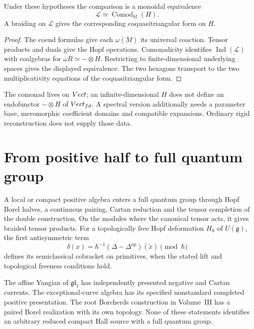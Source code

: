 \begin{theorem}
Under these hypotheses the comparison is a monoidal equivalence
\[
 \mathcal L\simeq\operatorname{Comod}_{\mathrm{fd}}(H).
\]
A braiding on $\mathcal L$ gives the corresponding coquasitriangular
form on $H$.
\end{theorem}
\begin{proof}
The coend formulas give each $\omega(M)$ its universal coaction.
Tensor products and duals give the Hopf operations. Comonadicity
identifies $\operatorname{Ind}(\mathcal L)$ with coalgebras for
$\overline\omega R\simeq-\otimes H$. Restricting to finite-dimensional
underlying spaces gives the displayed equivalence. The two hexagons
transport to the two multiplicativity equations of the
coquasitriangular form.
\end{proof}

The comonad lives on $Vect$; an infinite-dimensional $H$ does not
define an endofunctor $-\otimes H$ of $Vect_{fd}$.
A spectral version additionally needs a parameter base, meromorphic
coefficient domains and compatible expansions. Ordinary rigid
reconstruction does not supply those data.

\section{From positive half to full quantum group}
A local or compact positive algebra enters a full quantum group
through Hopf Borel halves, a continuous pairing, Cartan reduction and
the tensor completion of the double construction. On the modules
where the canonical tensor acts, it gives braided tensor products.
For a topologically free Hopf deformation $H_\hbar$ of $U(\mathfrak g)$,
the first antisymmetric term
\[
 \delta(x)=\hbar^{-1}(\Delta-\Delta^{\mathrm{op}})(\widetilde x)
                         \pmod\hbar
\]
defines its semiclassical cobracket on primitives, when the stated
lift and topological freeness conditions hold.

The affine Yangian of $\mathfrak{gl}_1$ has independently presented
negative and Cartan currents. The exceptional-curve algebra has its
specified nonstandard completed positive presentation. The root
Borcherds construction in Volume~III has a paired Borel realization
with its own topology. None of these statements identifies an
arbitrary reduced compact Hall source with a full quantum group.

